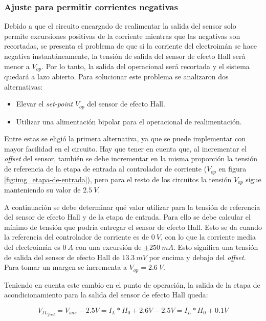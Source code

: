 \subsubsection{Ajuste para permitir corrientes negativas}

Debido a que el circuito encargado de realimentar la salida del sensor solo permite excursiones positivas de la corriente mientras que las negativas son recortadas, se presenta el problema de que si la corriente del electroimán se hace negativa instantáneamente, la tensión de salida del sensor de efecto Hall será menor a $V_{op}$. Por lo tanto, la salida del operacional será recortada y el sistema quedará a lazo abierto. Para solucionar este problema se analizaron dos alternativas:

\begin{itemize} 
	\item Elevar el \textsl{set-point}  $V_{op}$ del sensor de efecto Hall.
	
	\item Utilizar una alimentación bipolar para el operacional de realimentación.
\end{itemize}

Entre estas se eligió la primera alternativa, ya que se puede implementar con mayor facilidad en el circuito. Hay que tener en cuenta que, al incrementar el \textsl{offset} del sensor, también se debe incrementar en la misma proporción la tensión de referencia de la etapa de entrada al controlador de corriente ($V_{op}$ en figura \ref{fig:img_etapa-de-entrada}), pero para el resto de los circuitos la tensión $V_{op}$ sigue manteniendo su valor de $2.5\:V$.

A continuación se debe determinar qué valor utilizar para la tensión de referencia del sensor de efecto Hall y de la etapa de entrada. Para ello se debe calcular el mínimo de tensión que podría entregar el sensor de efecto Hall. Esto se da cuando la referencia del controlador de corriente es de $0\:V$, con lo que la corriente media del electroimán es $0 \:A$ con una excursión de $±250\:mA$. Esto significa una tensión de salida del sensor de efecto Hall de $13.3\:mV$ por encima y debajo del \textsl{offset}. Para tomar un margen se incrementa a $V_{op}=2.6\:V$. 

Teniendo en cuenta este cambio en el punto de operación, la salida de la etapa de acondicionamiento para la salida del sensor de efecto Hall queda:

\begin{equation} \label{eq_salida_restador_hall_2}
	V_{IL_{feed}}=V_{sns}-2.5V =I_L*H_0 + 2.6V - 2.5V =I_L*H_0+0.1V
\end{equation}

